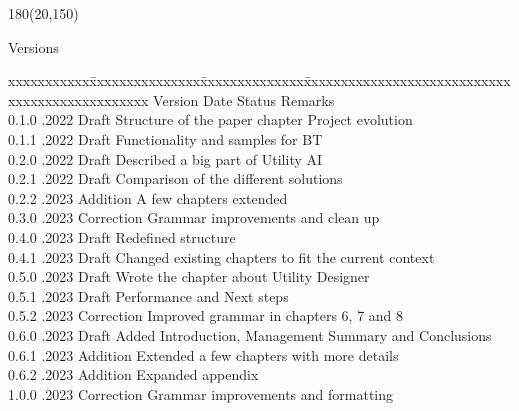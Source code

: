
\begin{textblock}{180}(20,150)
\color{black}
\begin{huge}
Versions
\end{huge}
\vspace{10mm}

\fontsize{10pt}{18pt}\selectfont
\begin{tabbing}
xxxxxxxxxxx\=xxxxxxxxxxxxxxx\=xxxxxxxxxxxxxx\=xxxxxxxxxxxxxxxxxxxxxxxxxxxxxxxxxxxxxxxxxxxxxxx \kill
Version	\> Date	\> Status			\> Remarks		\\
0.1.0	.2022	\> Draft		\> Structure of the paper chapter Project evolution	\\ 
0.1.1	.2022	\> Draft		\> Functionality and samples for BT	\\	
0.2.0	.2022	\> Draft		\> Described a big part of Utility AI	\\ 
0.2.1	.2022	\> Draft		\> Comparison of the different solutions	\\ 
0.2.2	.2023	\> Addition 	\> A few chapters extended	\\
0.3.0	.2023	\> Correction	\> Grammar improvements and clean up	\\
0.4.0	.2023	\> Draft		\> Redefined structure	\\
0.4.1	.2023	\> Draft		\> Changed existing chapters to fit the current context	\\
0.5.0	.2023	\> Draft		\> Wrote the chapter about Utility Designer	\\
0.5.1	.2023	\> Draft		\> Performance and Next steps	\\
0.5.2	.2023	\> Correction	\> Improved grammar in chapters 6, 7 and 8	\\
0.6.0	.2023	\> Draft		\> Added Introduction, Management Summary and Conclusions	\\
0.6.1	.2023	\> Addition		\> Extended a few chapters with more details	\\
0.6.2	.2023	\> Addition		\> Expanded appendix	\\
1.0.0	.2023	\> Correction	\> Grammar improvements and formatting	\\
\end{tabbing}

\end{textblock}
